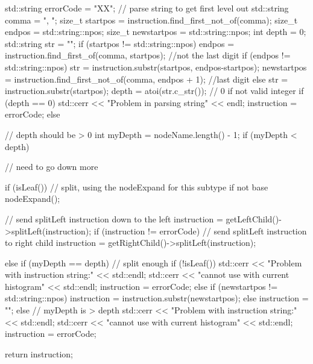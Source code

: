 \begin{DoxyCode}
    {
        std::string errorCode = "XX";
        // parse string to get first level out
        std::string comma = ", ";
        size_t startpos = instruction.find_first_not_of(comma);
        size_t endpos = std::string::npos;
        size_t newstartpos = std::string::npos;
        int depth = 0;
        std::string str = "";
        if (startpos != std::string::npos) {
            endpos = instruction.find_first_of(comma, startpos);
            //not the last digit
            if (endpos != std::string::npos) {
                str = instruction.substr(startpos, endpos-startpos);
                newstartpos = instruction.find_first_not_of(comma,
                                                        endpos + 1);
            }
            //last digit
            else {
                str = instruction.substr(startpos);
            }
        }
        depth = atoi(str.c_str()); // 0 if not valid integer
        if (depth == 0) {
            std::cerr << "Problem in parsing string" << endl;
            instruction = errorCode;
        }
        else { // depth should be > 0
            int myDepth = nodeName.length() - 1;
            if (myDepth < depth) { // need to go down more

                if (isLeaf()) {
                    // split, using the nodeExpand for this subtype if not base
                    nodeExpand();
                }

                // send splitLeft instruction down to the left
                instruction = getLeftChild()->splitLeft(instruction);
                if (instruction != errorCode) {
                    // send splitLeft instruction to right child
                    instruction = getRightChild()->splitLeft(instruction);
                }
            }
            else if (myDepth == depth) {     // split enough
                if (!isLeaf()) {
                    std::cerr << "Problem with instruction string:" << 
      std::endl;
                    std::cerr << "cannot use with current histogram" << 
      std::endl;
                    instruction = errorCode;
                }
                else if (newstartpos != std::string::npos) {
                    instruction = instruction.substr(newstartpos);
                }
                else instruction = "";
            }
            else { // myDepth is > depth
                std::cerr << "Problem with instruction string:" << std::endl;
                std::cerr << "cannot use with current histogram" << std::endl;
                instruction = errorCode;
            }
        }

        return instruction;
    }
\end{DoxyCode}
